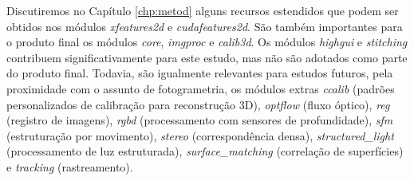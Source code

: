 Discutiremos no Capítulo \ref{chp:metod} alguns recursos estendidos que podem ser obtidos nos módulos \textit{xfeatures2d} e \textit{cudafeatures2d}. São também importantes para o produto final os módulos \textit{core}, \textit{imgproc} e \textit{calib3d}. Os módulos \textit{highgui} e \textit{stitching} contribuem significativamente para este estudo, mas não são adotados como parte do produto final. Todavia, são igualmente relevantes para estudos futuros, pela proximidade com o assunto de fotogrametria, os módulos extras 
\textit{ccalib} (padrões personalizados de calibração para reconstrução 3D),
\textit{optflow} (fluxo óptico), 
\textit{reg} (registro de imagens), 
\textit{rgbd} (processamento com sensores de profundidade), 
\textit{sfm} (estruturação por movimento),
\textit{stereo} (correspondência densa),
\textit{structured\_light} (processamento de luz estruturada),
\textit{surface\_matching} (correlação de superfícies) e
\textit{tracking} (rastreamento).







